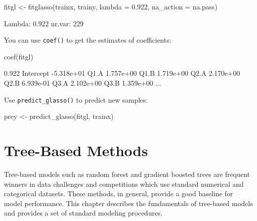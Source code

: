\documentclass[
  12pt,
]{krantz}
\makeatletter
\newenvironment{Shaded}{\begin{snugshade}}{\end{snugshade}}
\newcommand{\AttributeTok}[1]{\textcolor[rgb]{0.61,0.61,0.61}{#1}}
\newcommand{\FloatTok}[1]{\textcolor[rgb]{0.06,0.06,0.06}{#1}}
\newcommand{\FunctionTok}[1]{\textcolor[rgb]{0,0,0}{#1}}
\newcommand{\NormalTok}[1]{#1}
\newcommand{\OtherTok}[1]{\textcolor[rgb]{0.37,0.37,0.37}{#1}}
\newenvironment{kframe}{%
\medskip{}
\setlength{\fboxsep}{.8em}
 \def\at@end@of@kframe{}%
 \ifinner\ifhmode%
  \def\at@end@of@kframe{\end{minipage}}%
  \begin{minipage}{\columnwidth}%
 \fi\fi%
 \def\FrameCommand##1{\hskip\@totalleftmargin \hskip-\fboxsep
 \colorbox{shadecolor}{##1}\hskip-\fboxsep
     \hskip-\linewidth \hskip-\@totalleftmargin \hskip\columnwidth}%
 \MakeFramed {\advance\hsize-\width
   \@totalleftmargin\z@ \linewidth\hsize
   \@setminipage}}%
 {\par\unskip\endMakeFramed%
 \at@end@of@kframe}
\renewenvironment{Shaded}{\begin{kframe}}{\end{kframe}}
\makeatother
\begin{document}
\begin{Shaded}
\begin{Highlighting}[]
\NormalTok{fitgl }\OtherTok{\textless{}{-}} \FunctionTok{fitglasso}\NormalTok{(trainx, trainy, }
                   \AttributeTok{lambda =} \FloatTok{0.922}\NormalTok{, }\AttributeTok{na\_action =}\NormalTok{ na.pass)}
\end{Highlighting}
\end{Shaded}

\begin{Shaded}
\begin{Highlighting}[]
\NormalTok{Lambda: 0.922  nr.var: 229}
\end{Highlighting}
\end{Shaded}

You can use \texttt{coef()} to get the estimates of coefficients:

\begin{Shaded}
\begin{Highlighting}[]
\FunctionTok{coef}\NormalTok{(fitgl)}
\end{Highlighting}
\end{Shaded}

\begin{Shaded}
\begin{Highlighting}[]
\NormalTok{               0.922}
\NormalTok{Intercept {-}5.318e+01}
\NormalTok{Q1.A       1.757e+00}
\NormalTok{Q1.B       1.719e+00}
\NormalTok{Q2.A       2.170e+00}
\NormalTok{Q2.B       6.939e{-}01}
\NormalTok{Q3.A       2.102e+00}
\NormalTok{Q3.B       1.359e+00}
\NormalTok{...}
\end{Highlighting}
\end{Shaded}

Use \texttt{predict\_glasso()} to predict new samples:

\begin{Shaded}
\begin{Highlighting}[]
\NormalTok{prey }\OtherTok{\textless{}{-}} \FunctionTok{predict\_glasso}\NormalTok{(fitgl, trainx)}
\end{Highlighting}
\end{Shaded}

\hypertarget{treemodel}{%
\chapter{Tree-Based Methods}\label{treemodel}}

Tree-based models such as random forest and gradient boosted trees are frequent winners in data challenges and competitions which use standard numerical and categorical datasets. These methods, in general, provide a good baseline for model performance. This chapter describes the fundamentals of tree-based models and provides a set of standard modeling procedures.
\end{document}
